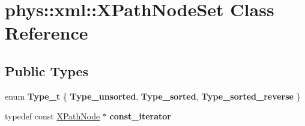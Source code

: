 \hypertarget{classphys_1_1xml_1_1XPathNodeSet}{
\section{phys::xml::XPathNodeSet Class Reference}
\label{de/dc2/classphys_1_1xml_1_1XPathNodeSet}
}
\subsection*{Public Types}
\begin{DoxyCompactItemize}
\item 
enum {\bfseries Type\_\-t} \{ {\bfseries Type\_\-unsorted}, 
{\bfseries Type\_\-sorted}, 
{\bfseries Type\_\-sorted\_\-reverse}
 \}
\item 
\hypertarget{classphys_1_1xml_1_1XPathNodeSet_ab893a3c9d60393ae5b3740196a5a6691}{
typedef const \hyperlink{classphys_1_1xml_1_1XPathNode}{XPathNode} $\ast$ {\bfseries const\_\-iterator}}
\label{de/dc2/classphys_1_1xml_1_1XPathNodeSet_ab893a3c9d60393ae5b3740196a5a6691}

\end{DoxyCompactItemize}
